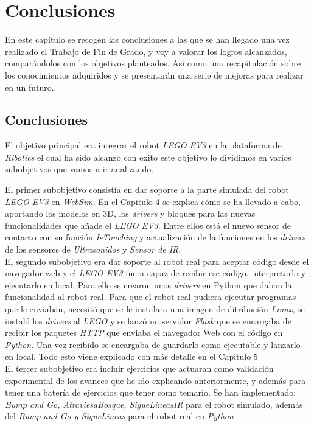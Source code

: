 \chapter{Conclusiones}
\label{chap:conclusiones}

En este capítulo se recogen las conclusiones a las que se han llegado una vez realizado el Trabajo de Fin de Grado, y voy a valorar los logros alcanzados, comparándolos con los objetivos planteados. Así como una recapitulación sobre los conocimientos adquiridos y se presentarán una serie de mejoras para realizar en un futuro.

\section{Conclusiones}
\label{sec:conclusiones}
El objetivo principal era  integrar el robot \textit{LEGO EV3} en la plataforma de \textit{Kibotics} el cual ha sido alcanzo con exito este objetivo lo dividimos en varios subobjetivos que vamos a ir analizando.

El primer subobjetivo consistía en dar soporte a la parte simulada del robot  \textit{LEGO EV3} en \textit{WebSim}. En el Capitulo 4 se explica cómo se ha llevado a cabo, aportando los modelos en 3D, los \textit{drivers} y bloques para las nuevas funcionalidades que añade el \textit{LEGO EV3}. Entre ellos está el nuevo sensor de contacto con su función \textit{IsTouching} y actualización de la funciones en los \textit{drivers} de los sensores de \textit{Ultrasonidos} y \textit{Sensor de IR}.\\

El segundo subobjetivo era dar soporte al robot real para aceptar código desde el navegador web y el \textit{LEGO EV3} fuera capaz de recibir ese código, interpretarlo y ejecutarlo en local. Para ello se crearon unos \textit{drivers} en Python que daban la funcionalidad al robot real. Para que el robot real pudiera ejecutar programas que le enviaban, necesitó que se le instalara una imagen de ditribución \textit{Linux}, se instaló los \textit{drivers} al \textit{LEGO} y se lanzó un servidor \textit{Flask} que se encargaba de recibir los paquetes \textit{HTTP} que enviaba el navegador Web con el código en \textit{Python}. Una vez recibido se encargaba de guardarlo como ejecutable y lanzarlo en local. Todo esto viene explicado con más detalle en el Capitulo 5\\

El tercer subobjetivo era incluir ejercicios que actuaran como validación experimental de los avances que he ido explicando anteriormente, y además para tener una batería de ejercicios que tener como temario. Se han implementado: \textit{Bump and Go, AtraviesaBosque, SigueLineasIR } para el robot simulado, además del \textit{Bump and Go y SigueLíneas} para el robot real en \textit{Python}

